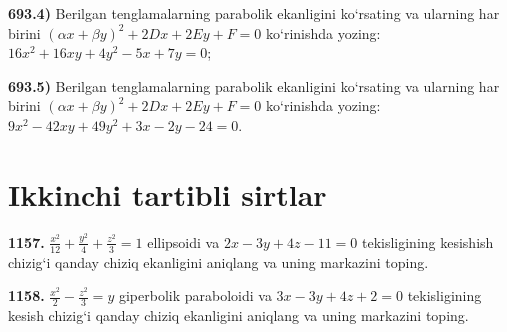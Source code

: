 \textbf{693.4)} Berilgan tenglamalarning parabolik ekanligini ko‘rsating va ularning har birini $(\alpha x+\beta y)^2+2 D x+2 E y+F=0$ ko‘rinishda yozing: $16 x^2+16 x y+4 y^2-5 x+7 y=0$;

\textbf{693.5)} Berilgan tenglamalarning parabolik ekanligini ko‘rsating va ularning har birini $(\alpha x+\beta y)^2+2 D x+2 E y+F=0$ ko‘rinishda yozing: $9 x^2-42 x y+49 y^2+3 x-2 y-24=0$.



\section{Ikkinchi tartibli sirtlar}



\textbf{1157.} $\frac{x^2}{12}+\frac{y^2}{4}+\frac{z^2}{3}=1$ ellipsoidi va $2x-3y+4z-11=0$ tekisligining kesishish chizig‘i qanday chiziq ekanligini aniqlang va uning markazini toping.

\textbf{1158.} $\frac{x^2}{2}-\frac{z^2}{3}=y$ giperbolik paraboloidi va $3x-3y+4z+2=0$ tekisligining kesish chizig‘i qanday chiziq ekanligini aniqlang va uning markazini toping.